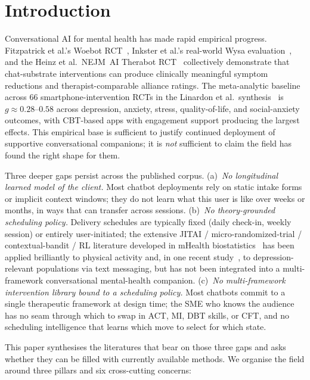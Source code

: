 \documentclass[10pt,conference]{article}
\begin{document}
\section{Introduction}\label{sec:introduction}

Conversational AI for mental health has made rapid empirical progress.
Fitzpatrick et al.'s Woebot
RCT~\cite{Fitzpatrick2017Woebot}, Inkster et al.'s real-world Wysa
evaluation~\cite{Inkster2018Wysa}, and the Heinz et al.\ NEJM~AI
Therabot RCT~\cite{Heinz2025TherabotRCT} collectively demonstrate that
chat-substrate interventions can produce clinically meaningful symptom
reductions and therapist-comparable alliance ratings. The meta-analytic
baseline across 66 smartphone-intervention RCTs in the Linardon et
al.\ synthesis~\cite{Linardon2019Meta} is
$g\!\approx\!0.28\text{--}0.58$ across depression, anxiety, stress,
quality-of-life, and social-anxiety outcomes, with CBT-based apps with
engagement support producing the largest effects. This empirical
base is sufficient to justify continued deployment of supportive
conversational companions; it is \emph{not} sufficient to claim the
field has found the right shape for them.

Three deeper gaps persist across the published corpus.
(a)~\emph{No longitudinal learned model of the client.} Most
chatbot deployments rely on static intake forms or implicit context
windows; they do not learn what this user is like over weeks
or months, in ways that can transfer across sessions.
(b)~\emph{No theory-grounded scheduling policy.} Delivery schedules
are typically fixed (daily check-in, weekly session) or entirely
user-initiated; the extensive JITAI / micro-randomized-trial /
contextual-bandit / RL literature developed in mHealth
biostatistics~\cite{NahumShani2018JITAI,Klasnja2015MRT,Liao2020PersonalizedHeartSteps}
has been applied brilliantly to physical activity and, in one recent
study~\cite{Aguilera2024DIAMANTERL}, to depression-relevant populations
via text messaging, but has not been integrated into a multi-framework
conversational mental-health companion. (c)~\emph{No multi-framework
intervention library bound to a scheduling policy.} Most chatbots
commit to a single therapeutic framework at design time; the SME who
knows the audience has no seam through which to swap in ACT, MI, DBT
skills, or CFT, and no scheduling intelligence that learns which
move to select for which state.

This paper synthesises the literatures that bear on those three gaps
and asks whether they can be filled with currently available methods.
We organise the field around three pillars and six cross-cutting
concerns:
\end{document}
